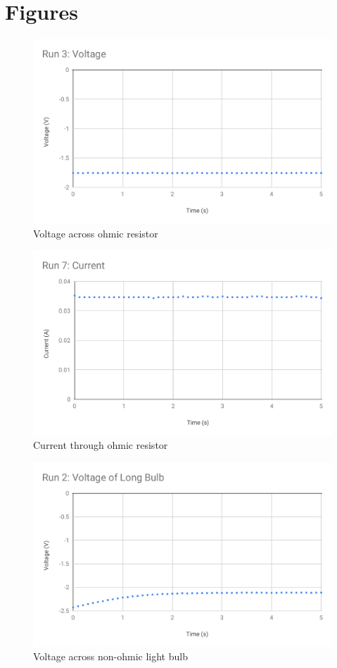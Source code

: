 \section{Figures}
%
\begin{figure}[ht]
	\centering
	\includegraphics[scale=0.74]{image/03-serial-parallel/resistor-V.pdf}
	\caption{Voltage across ohmic resistor}
	\label{figure.03.resistor.v}
\end{figure}
%
\begin{figure}[ht]
	\centering
	\includegraphics[scale=0.74]{image/03-serial-parallel/resistor-I.pdf}
	\caption{Current through ohmic resistor}
	\label{figure.03.resistor.i}
\end{figure}
%
\begin{figure}[ht]
	\centering
	\includegraphics[scale=0.74]{image/03-serial-parallel/bulb-V.pdf}
	\caption{Voltage across non-ohmic light bulb}
	\label{figure.03.bulb.v}
\end{figure}
